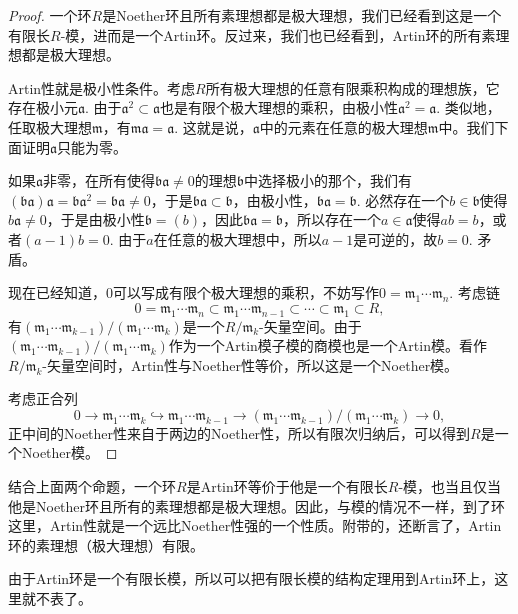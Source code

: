 \begin{proof}
	一个环$R$是Noether环且所有素理想都是极大理想，我们已经看到这是一个有限长$R$-模，进而是一个Artin环。反过来，我们也已经看到，Artin环的所有素理想都是极大理想。

	Artin性就是极小性条件。考虑$R$所有极大理想的任意有限乘积构成的理想族，它存在极小元$\mathfrak{a}$. 由于$\mathfrak{a}^2\subset \mathfrak{a}$也是有限个极大理想的乘积，由极小性$\mathfrak{a}^2=\mathfrak{a}$. 类似地，任取极大理想$\mathfrak{m}$，有$\mathfrak{m}\mathfrak{a}=\mathfrak{a}$. 这就是说，$\mathfrak{a}$中的元素在任意的极大理想$\mathfrak{m}$中。我们下面证明$\mathfrak{a}$只能为零。

	如果$\mathfrak{a}$非零，在所有使得$\mathfrak{b}\mathfrak{a}\neq 0$的理想$\mathfrak{b}$中选择极小的那个，我们有$(\mathfrak{b}\mathfrak{a})\mathfrak{a}=\mathfrak{b}\mathfrak{a}^2=\mathfrak{b}\mathfrak{a}\neq 0$，于是$\mathfrak{b}\mathfrak{a}\subset \mathfrak{b}$，由极小性，$\mathfrak{b}\mathfrak{a}=\mathfrak{b}$. 必然存在一个$b\in\mathfrak{b}$使得$b\mathfrak{a}\neq 0$，于是由极小性$\mathfrak{b}=(b)$，因此$\mathfrak{b}\mathfrak{a}=\mathfrak{b}$，所以存在一个$a\in \mathfrak{a}$使得$ab=b$，或者$(a-1)b=0$. 由于$a$在任意的极大理想中，所以$a-1$是可逆的，故$b=0$. 矛盾。

	现在已经知道，$0$可以写成有限个极大理想的乘积，不妨写作$0=\mathfrak{m}_1\cdots \mathfrak{m}_n$. 考虑链
	\[
	0=\mathfrak{m}_1\cdots \mathfrak{m}_n\subset \mathfrak{m}_1\cdots \mathfrak{m}_{n-1}\subset \cdots\subset \mathfrak{m}_1\subset R,
	\]
	有$(\mathfrak{m}_1\cdots \mathfrak{m}_{k-1})/(\mathfrak{m}_1\cdots \mathfrak{m}_{k})$是一个$R/\mathfrak{m}_{k}$-矢量空间。由于$(\mathfrak{m}_1\cdots \mathfrak{m}_{k-1})/(\mathfrak{m}_1\cdots \mathfrak{m}_{k})$作为一个Artin模子模的商模也是一个Artin模。看作$R/\mathfrak{m}_{k}$-矢量空间时，Artin性与Noether性等价，所以这是一个Noether模。

	考虑正合列
	\[
	0\to \mathfrak{m}_1\cdots \mathfrak{m}_{k}\hookrightarrow\mathfrak{m}_1\cdots \mathfrak{m}_{k-1}\to (\mathfrak{m}_1\cdots \mathfrak{m}_{k-1})/(\mathfrak{m}_1\cdots \mathfrak{m}_{k})\to 0,
	\]
	正中间的Noether性来自于两边的Noether性，所以有限次归纳后，可以得到$R$是一个Noether模。
\end{proof}

\para 结合上面两个命题，一个环$R$是Artin环等价于他是一个有限长$R$-模，也当且仅当他是Noether环且所有的素理想都是极大理想。因此，与模的情况不一样，到了环这里，Artin性就是一个远比Noether性强的一个性质。附带的，还断言了，Artin环的素理想（极大理想）有限。\endpara

由于Artin环是一个有限长模，所以可以把有限长模的结构定理用到Artin环上，这里就不表了。